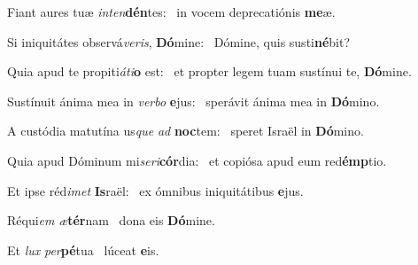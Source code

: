 \item Fiant aures tuæ \textit{in}\textit{ten}\textbf{dén}tes:~\psstar{} in vocem deprecatiónis \textbf{me}æ.

\item Si iniquitátes observá\textit{ve}\textit{ris}, \textbf{Dó}mine:~\psstar{} Dómine, quis susti\textbf{né}bit?

\item Quia apud te propiti\textit{á}\textit{ti}\textbf{o} est:~\psstar{} et propter legem tuam sustínui te, \textbf{Dó}mine.

\item Sustínuit ánima mea in \textit{ver}\textit{bo} \textbf{e}jus:~\psstar{} sperávit ánima mea in \textbf{Dó}mino.

\item A custódia matutína us\textit{que} \textit{ad} \textbf{noc}tem:~\psstar{} speret Israël in \textbf{Dó}mino.

\item Quia apud Dóminum mi\textit{se}\textit{ri}\textbf{cór}dia:~\psstar{} et copiósa apud eum red\textbf{émp}tio.

\item Et ipse réd\textit{i}\textit{met} \textbf{Is}raël:~\psstar{} ex ómnibus iniquitátibus \textbf{e}jus.

\item Réqui\textit{em} \textit{æ}\textbf{tér}nam~\psstar{} dona eis \textbf{Dó}mine.

\item Et \textit{lux} \textit{per}\textbf{pé}tua~\psstar{} lúceat \textbf{e}is.